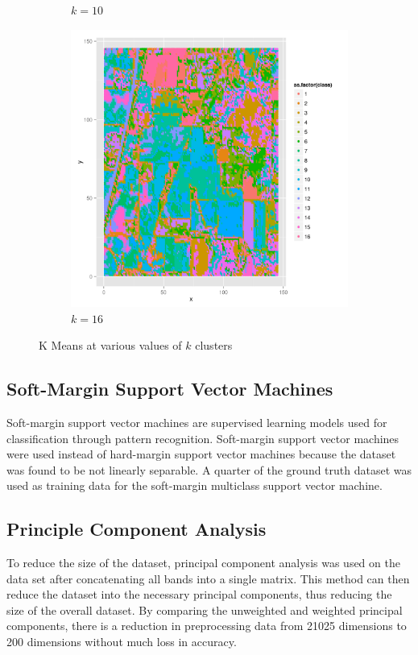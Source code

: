 \documentclass[10pt,letterpaper]{article}
\begin{document}
\begin{figure}
\begin{center}
\begin{subfigure}[b]{0.24\textwidth}
\caption{$k=10$}
\end{subfigure}
\begin{subfigure}[b]{0.24\textwidth}
\includegraphics[width=\textwidth]{../Presentation/km16.png}
\caption{$k=16$}
\end{subfigure}
\caption{K Means at various values of $k$ clusters}
\end{center}
\end{figure}
\subsection{Soft-Margin Support Vector Machines}
Soft-margin support vector machines are supervised learning models used for classification through pattern recognition. Soft-margin support vector machines were used instead of hard-margin support vector machines because the dataset was found to be not linearly separable. A quarter of the ground truth dataset was used as training data for the soft-margin multiclass support vector machine.
\subsection{Principle Component Analysis}
To reduce the size of the dataset, principal component analysis was used on the data set after concatenating all bands into a single matrix. This method can then reduce the dataset into the necessary principal components, thus reducing the size of the overall dataset. By comparing the unweighted and weighted principal components, there is a reduction in preprocessing data from 21025 dimensions to 200 dimensions without much loss in accuracy.
\end{document}
